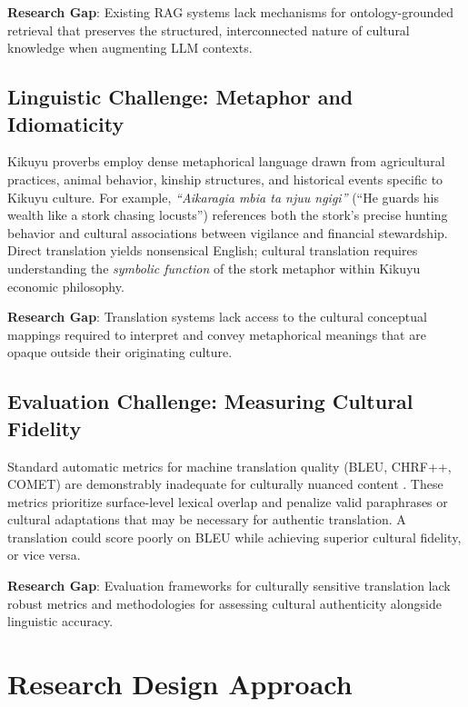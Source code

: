 \textbf{Research Gap}: Existing RAG systems lack mechanisms for ontology-grounded retrieval that preserves the structured, interconnected nature of cultural knowledge when augmenting LLM contexts.

\subsection{Linguistic Challenge: Metaphor and Idiomaticity}
\label{subsec:ling_challenge}

Kikuyu proverbs employ dense metaphorical language drawn from agricultural practices, animal behavior, kinship structures, and historical events specific to Kikuyu culture. For example, \emph{``Aikaragia mbia ta njuu ngigi''} (``He guards his wealth like a stork chasing locusts'') references both the stork's precise hunting behavior and cultural associations between vigilance and financial stewardship. Direct translation yields nonsensical English; cultural translation requires understanding the \emph{symbolic function} of the stork metaphor within Kikuyu economic philosophy.

\textbf{Research Gap}: Translation systems lack access to the cultural conceptual mappings required to interpret and convey metaphorical meanings that are opaque outside their originating culture.

\subsection{Evaluation Challenge: Measuring Cultural Fidelity}
\label{subsec:eval_challenge}

Standard automatic metrics for machine translation quality (BLEU, CHRF++, COMET) are demonstrably inadequate for culturally nuanced content \cite{mathur2020tangled}. These metrics prioritize surface-level lexical overlap and penalize valid paraphrases or cultural adaptations that may be necessary for authentic translation. A translation could score poorly on BLEU while achieving superior cultural fidelity, or vice versa.

\textbf{Research Gap}: Evaluation frameworks for culturally sensitive translation lack robust metrics and methodologies for assessing cultural authenticity alongside linguistic accuracy.

\section{Research Design Approach}
\label{sec:research_design_approach}

